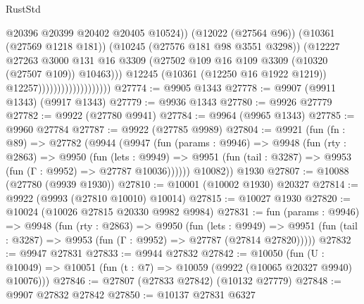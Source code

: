 \begin{lexlean}{RustStd}
\begin{coremodule}
                                                @20396
                                                @20399
                                                @20402
                                                @20405
                                                @10524))
                                            (@12022 (@27564 @96))
                                            (@10361 (@27569 @1218 @181))
                                            (@10245 (@27576 @181 @98 @3551 @3298))
                                            (@12227
                                              @27263
                                              @3000
                                              @131
                                              @16
                                              @3309
                                              (@27502
                                                @109
                                                @16
                                                @109
                                                @3309
                                                (@10320 (@27507 @109))
                                                @10463)))
                                          @12245
                                          (@10361 (@12250 @16 @1922 @1219))
                                          @12257)))))))))))))))))))
@27774 := @9905 @1343
@27778 := @9907 (@9911 @1343) (@9917 @1343)
@27779 := @9936 @1343
@27780 := @9926 @27779
@27782 := @9922 (@27780 @9941)
@27784 := @9964 (@9965 @1343)
@27785 := @9960 @27784
@27787 := @9922 (@27785 @9989)
@27804 := @9921
    (fun (fn : @89) =>
    @27782
      (@9944
        (@9947
          (fun (params : @9946) =>
          @9948
            (fun (rty : @2863) =>
            @9950
              (fun (lets : @9949) =>
              @9951 (fun (tail : @3287) => @9953 (fun (Γ : @9952) => @27787 @10036))))))
        @10082))
    @1930
@27807 := @10088 (@27780 (@9939 @1930))
@27810 := @10001 (@10002 @1930) @20327
@27814 := @9922 (@9993 (@27810 @10010) @10014)
@27815 := @10027 @1930
@27820 := @10024 (@10026 @27815 @20330 @9982 @9984)
@27831 := fun (params : @9946) =>
  @9948
    (fun (rty : @2863) =>
    @9950
      (fun (lets : @9949) =>
      @9951 (fun (tail : @3287) => @9953 (fun (Γ : @9952) => @27787 (@27814 @27820)))))
@27832 := @9947 @27831
@27833 := @9944 @27832
@27842 := @10050
    (fun (U : @10049) => @10051 (fun (t : @7) => @10059 (@9922 (@10065 @20327 @9940) @10076)))
@27846 := @27807 (@27833 @27842) (@10132 @27779)
@27848 := @9907 @27832 @27842
@27850 := @10137 @27831 @6327

\end{coremodule}
\end{lexlean}
